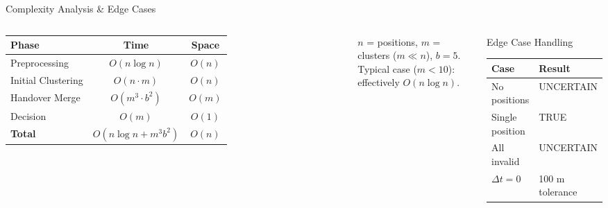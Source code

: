 \documentclass[aspectratio=169,xcolor=dvipsnames,9pt]{beamer}
\begin{document}
\begin{frame}{Complexity Analysis \& Edge Cases}
    \begin{columns}[T]
        \begin{table}
            \centering
            \begin{tabular}{lcc}
                \toprule
                \textbf{Phase} & \textbf{Time} & \textbf{Space} \\
                \midrule
                Preprocessing & $O(n \log n)$ & $O(n)$ \\
                Initial Clustering & $O(n \cdot m)$ & $O(n)$ \\
                Handover Merge & $O(m^3 \cdot b^2)$ & $O(m)$ \\
                Decision & $O(m)$ & $O(1)$ \\
                \midrule
                \textbf{Total} & $O(n \log n + m^3 b^2)$ & $O(n)$ \\
                \bottomrule
            \end{tabular}
        \end{table}

        \vspace{0.3em}
        $n$ = positions, $m$ = clusters ($m \ll n$), $b = 5$.\\
        Typical case ($m < 10$): effectively \textbf{$O(n \log n)$}.

        \begin{block}{Edge Case Handling}
            \begin{table}
                \centering
                \small
                \begin{tabular}{ll}
                    \toprule
                    \textbf{Case} & \textbf{Result} \\
                    \midrule
                    No positions & UNCERTAIN \\
                    Single position & TRUE \\
                    All invalid & UNCERTAIN \\
                    $\Delta t = 0$ & 100 m tolerance \\
                    \bottomrule
                \end{tabular}
            \end{table}
        \end{block}


\end{columns}
\end{frame}
\end{document}
